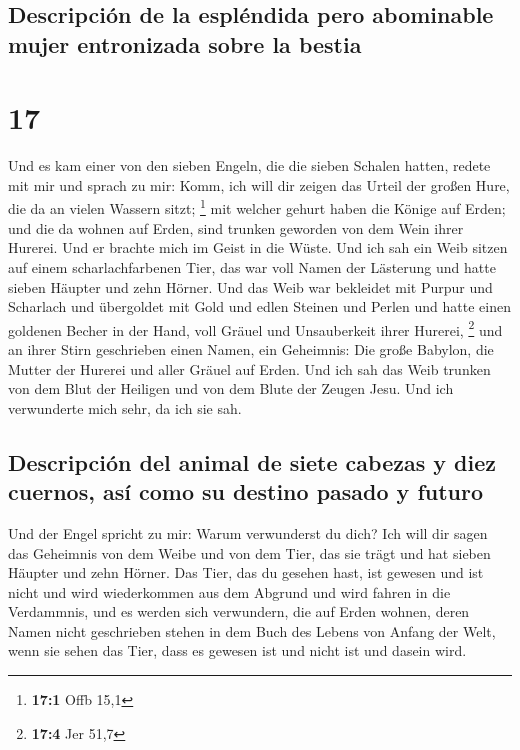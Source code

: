 \hypertarget{descripciuxf3n-de-la-espluxe9ndida-pero-abominable-mujer-entronizada-sobre-la-bestia}{%
\subsection{Descripción de la espléndida pero abominable mujer
entronizada sobre la
bestia}\label{descripciuxf3n-de-la-espluxe9ndida-pero-abominable-mujer-entronizada-sobre-la-bestia}}

\hypertarget{section-16}{%
\section{17}\label{section-16}}

 Und es kam einer von den sieben Engeln, die die sieben
Schalen hatten, redete mit mir und sprach zu mir: Komm, ich will dir
zeigen das Urteil der großen Hure, die da an vielen Wassern sitzt;
\footnote{\textbf{17:1} Offb 15,1}  mit welcher gehurt
haben die Könige auf Erden; und die da wohnen auf Erden, sind trunken
geworden von dem Wein ihrer Hurerei.  Und er brachte mich
im Geist in die Wüste. Und ich sah ein Weib sitzen auf einem
scharlachfarbenen Tier, das war voll Namen der Lästerung und hatte
sieben Häupter und zehn Hörner.  Und das Weib war
bekleidet mit Purpur und Scharlach und übergoldet mit Gold und edlen
Steinen und Perlen und hatte einen goldenen Becher in der Hand, voll
Gräuel und Unsauberkeit ihrer Hurerei, \footnote{\textbf{17:4} Jer 51,7}
 und an ihrer Stirn geschrieben einen Namen, ein
Geheimnis: Die große Babylon, die Mutter der Hurerei und aller Gräuel
auf Erden.  Und ich sah das Weib trunken von dem Blut der
Heiligen und von dem Blute der Zeugen Jesu. Und ich verwunderte mich
sehr, da ich sie sah.

\hypertarget{descripciuxf3n-del-animal-de-siete-cabezas-y-diez-cuernos-asuxed-como-su-destino-pasado-y-futuro}{%
\subsection{Descripción del animal de siete cabezas y diez cuernos, así
como su destino pasado y
futuro}\label{descripciuxf3n-del-animal-de-siete-cabezas-y-diez-cuernos-asuxed-como-su-destino-pasado-y-futuro}}

 Und der Engel spricht zu mir: Warum verwunderst du dich?
Ich will dir sagen das Geheimnis von dem Weibe und von dem Tier, das sie
trägt und hat sieben Häupter und zehn Hörner.  Das Tier,
das du gesehen hast, ist gewesen und ist nicht und wird wiederkommen aus
dem Abgrund und wird fahren in die Verdammnis, und es werden sich
verwundern, die auf Erden wohnen, deren Namen nicht geschrieben stehen
in dem Buch des Lebens von Anfang der Welt, wenn sie sehen das Tier,
dass es gewesen ist und nicht ist und dasein wird.

